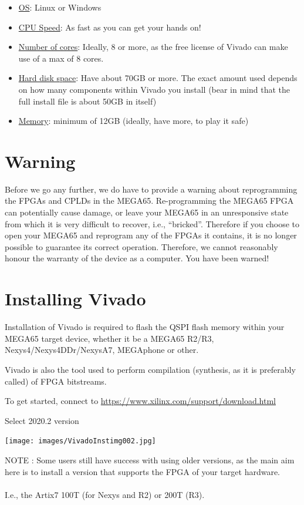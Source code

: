 \begin{itemize}
  \item \underline{OS}: Linux or Windows
  \item \underline{CPU Speed}: As fast as you can get your hands on!
  \item \underline{Number of cores}: Ideally, 8 or more, as the free license of Vivado can make use of a max of 8 cores.
  \item \underline{Hard disk space}: Have about 70GB or more. The exact amount used depends on how many components within Vivado you install (bear in mind that the full install file is about 50GB in itself)
  \item \underline{Memory}: minimum of 12GB (ideally, have more, to play it safe)
\end{itemize}

\section{Warning}

Before we go any further, we do have to provide a warning about reprogramming the FPGAs and
CPLDs in the MEGA65.
Re-programming the MEGA65 FPGA can potentially cause
damage, or leave your MEGA65 in an unresponsive state from which it is very difficult to
recover, i.e., ``bricked''.  Therefore if you choose to open your MEGA65 and reprogram
any of the FPGAs it contains, it is no longer possible to guarantee its correct operation.
Therefore, we cannot reasonably honour the warranty of the
device as a computer.
You have been warned!

\section{Installing Vivado}
\label{sec:installvivado}

Installation of Vivado is required to flash the QSPI flash memory within your MEGA65 target device, whether it be a MEGA65 R2/R3, Nexys4/Nexys4DDr/NexysA7, MEGAphone or other.

Vivado is also the tool used to perform compilation (synthesis, as it is preferably called) of FPGA bitstreams.

To get started, connect to \url{https://www.xilinx.com/support/download.html}

\begin{minipage}{\linewidth}
  Select 2020.2 version
  \\
  \begin{center}
    \texttt{[image: images/VivadoInstimg002.jpg]}
  \end{center}
  NOTE : Some users still have success with using older versions, as the main aim here is to install a version that supports the FPGA of your target hardware. \\
  \\
  I.e., the Artix7 100T (for Nexys and R2) or 200T (R3).
\end{minipage}

